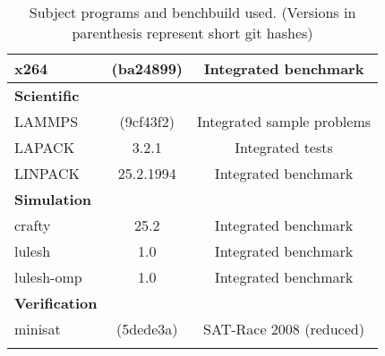 \begin{longtable}{lcC}
    x264                     & (ba24899)               & Integrated benchmark\\
    \midrule
    \textbf{Scientific}\\
    LAMMPS                   & (9cf43f2)               & Integrated sample problems\\
    LAPACK                   & 3.2.1                   & Integrated tests\\
    LINPACK                  & 25.2.1994               & Integrated benchmark\\
    \midrule
    \textbf{Simulation}\\
    crafty                   & 25.2                    & Integrated benchmark\\
    lulesh                   & 1.0                     & Integrated benchmark\\
    lulesh-omp               & 1.0                     & Integrated benchmark\\
    \midrule
    \textbf{Verification}\\
    minisat                  & (5dede3a)               & SAT-Race 2008 (reduced)\\
    \bottomrule
    \caption[Subject programs]{Subject programs and benchbuild used. (Versions in parenthesis represent short git hashes)}
    \label{tab:subjectPrograms}
\end{longtable}
